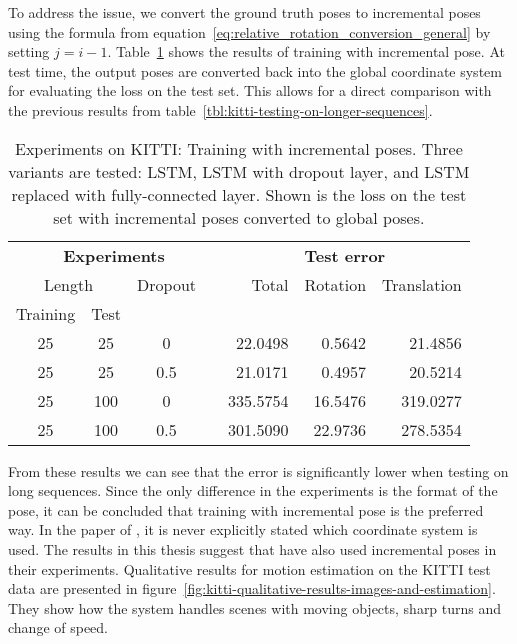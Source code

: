 		To address the issue, we convert the ground truth poses to incremental poses using the formula from equation~\ref{eq:relative_rotation_conversion_general} by setting $j = i - 1$.
		Table~\ref{tbl:kitti-incremental-pose-and-lstm-removal} shows the results of training with incremental pose.
		At test time, the output poses are converted back into the global coordinate system for evaluating the loss on the test set.
		This allows for a direct comparison with the previous results from table~\ref{tbl:kitti-testing-on-longer-sequences}.
		\begin{table}[tb]
			\small
			\begin{center}
				\begin{tabular}{ccccrrr}
					\toprule
					\multicolumn{4}{c}{\textbf{Experiments}}		& \multicolumn{3}{c}{\textbf{Test error}} 		\\
					\cmidrule(lr){1-4} 	\cmidrule(lr){5-7}
					\multicolumn{2}{c}{Length} & Dropout &	& Total & Rotation & Translation	\\ 
					Training & Test & & & & & \\
					\midrule
					25 & 25		& 0				& 	& 22.0498	& 0.5642	& 21.4856 		\\ 
					25 & 25		& 0.5			& 	& 21.0171	& 0.4957	& 20.5214		\\ 
					\midrule
					25 & 100	& 0			 	& 	& 335.5754	& 16.5476	& 319.0277 		\\ 
					25 & 100	& 0.5		 	& 	& 301.5090	& 22.9736	& 278.5354		\\ 
					\bottomrule
				\end{tabular}
			\end{center}
			\caption[Experiments on KITTI: Training with incremental poses]
					{Experiments on KITTI: Training with incremental poses.
					 Three variants are tested: LSTM, LSTM with dropout layer, and LSTM replaced with fully-connected layer.
					 Shown is the loss on the test set with incremental poses converted to global poses.
					 \label{tbl:kitti-incremental-pose-and-lstm-removal}}
		\end{table}
		From these results we can see that the error is significantly lower when testing on long sequences.
		Since the only difference in the experiments is the format of the pose, it can be concluded that training with incremental pose is the preferred way.
		In the paper of \cite{wang2017deepvo}, it is never explicitly stated which coordinate system is used.
		The results in this thesis suggest that \citeauthor{wang2017deepvo} have also used incremental poses in their experiments.
		Qualitative results for motion estimation on the KITTI test data are presented in figure~\ref{fig:kitti-qualitative-results-images-and-estimation}.
		They show how the system handles scenes with moving objects, sharp turns and change of speed.
		
